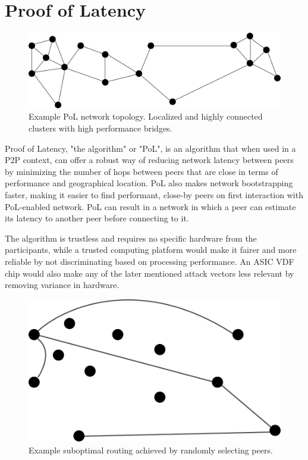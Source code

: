 \chapter{Proof of Latency}
\label{Proof of Latency}
\begin{figure}[H]
	\includegraphics[width=\textwidth]{pictures/pol_topology.pdf}
	\caption{Example PoL network topology. Localized and highly connected clusters with high performance bridges.}
	\label{PoL Example Topology}
\end{figure}

Proof of Latency, "the algorithm" or "PoL", is an algorithm that when used in a P2P context, can offer a robust way of reducing network latency between peers by minimizing the number of hops between peers that are close in terms of performance and geographical location. PoL also makes network bootstrapping faster, making it easier to find performant, close-by peers on first interaction with PoL-enabled network. PoL can result in a network in which a peer can estimate its latency to another peer before connecting to it.

The algorithm is trustless and requires no specific hardware from the participants, while a trusted computing platform would make it fairer and more reliable by not discriminating based on processing performance. An ASIC VDF chip would also make any of the later mentioned attack vectors less relevant by removing variance in hardware.

\begin{figure}
	\includegraphics[width=\textwidth]{pictures/random_routing.pdf}
	\caption{Example suboptimal routing achieved by randomly selecting peers.}
	\label{Subobtimal Topology}
\end{figure}

